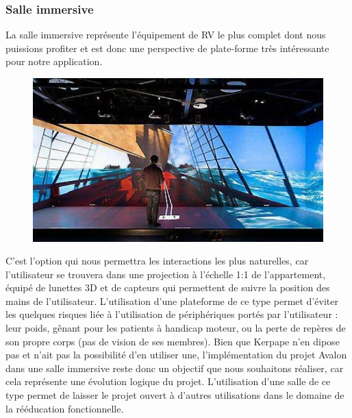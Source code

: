 \subsubsection{Salle immersive}
La salle immersive représente l'équipement de RV le plus complet dont nous puissions profiter et est donc une perspective de plate-forme très intéressante pour notre application.
\begin{figure}
	\centering
	\includegraphics[scale=0.5]{2-Specifications/img-utilisateur/immersia.jpg}
\end{figure}
C'est l'option qui nous permettra les interactions les plus naturelles, car l'utilisateur se trouvera dans une projection à l'échelle 1:1 de l'appartement, équipé de lunettes 3D et de capteurs qui permettent de suivre la position des mains de l'utilisateur. \newline
L'utilisation d'une plateforme de ce type permet d'éviter les quelques risques liée à l'utilisation de périphériques portés par l'utilisateur : leur poids, gênant pour les patients à handicap moteur, ou la perte de repères de son propre corps (pas de vision de ses membres).
Bien que Kerpape n'en dipose pas et n'ait pas la possibilité d'en utiliser une, l'implémentation du projet Avalon dans une salle immersive reste donc un objectif que nous souhaitons réaliser, car cela représente une évolution logique du projet.
L'utilisation d'une salle de ce type permet de laisser le projet ouvert à d'autres utilisations dans le domaine de la rééducation fonctionnelle.
